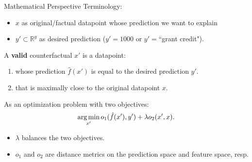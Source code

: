 \documentclass[aspectratio=169]{../latex_main/tntbeamer}  %
\begin{document}


\begin{frame}{Mathematical Perspective  }
	Terminology: 
	\begin{itemize}
		\item $x$ as original/factual datapoint whose prediction we want to explain
		\item $y' \subset \mathbb{R}^g$ as desired prediction ($y' = 1000$ or $y' = $``grant credit"). %
	\end{itemize}
	\vspace{0.3cm}
	A \textbf{valid} counterfactual $x'$ is a datapoint: 
	\begin{enumerate}
		\item whose prediction $\hat{f}(x')$ is equal to the desired prediction $y'$. 
		\item that is \alert{maximally close} to the original datapoint $x$.
	\end{enumerate}
	\pause
	As an optimization problem with two objectives: 
	\begin{equation}
		\operatorname*{arg\,min}_{x'} o_1(\hat{f}(x'), y') + \lambda o_2(x', x).
		\label{eq:optim}
	\end{equation}
	
	
	\begin{itemize}
		\item $\lambda$ balances the two objectives.
		\item $o_1$ and $o_2$ are distance metrics on the prediction space and feature space, resp.
	 \end{itemize}
\end{frame}	 
\end{document}
